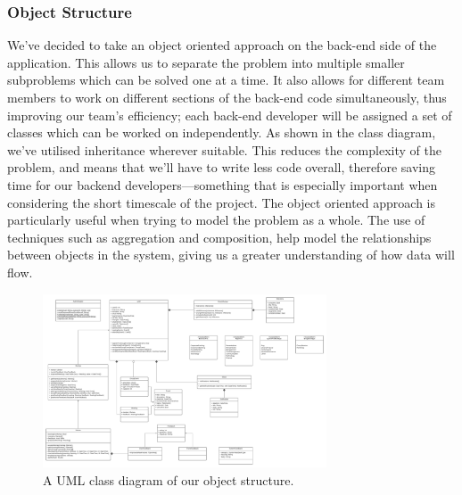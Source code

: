 \documentclass[10pt]{article}
\begin{document}
\subsubsection{Object Structure}
We've decided to take an object oriented approach on the back-end side of the
application. This allows us to separate the problem into multiple smaller
subproblems which can be solved one at a time. It also allows for different team
members to work on different sections of the back-end code simultaneously, thus
improving our team's efficiency; each back-end developer will be assigned a set
of classes which can be worked on independently. As shown in the class diagram,
we've utilised inheritance wherever suitable. This reduces the complexity of the
problem, and means that we'll have to write less code overall, therefore saving
time for our backend developers—something that is especially important when
considering the short timescale of the project. The object oriented approach is
particularly useful when trying to model the problem as a whole. The use of
techniques such as aggregation and composition, help model the relationships
between objects in the system, giving us a greater understanding of how data
will flow.

\begin{figure}[H]
    \centering
    \includegraphics[width=0.75\textwidth]{Objects}
    \caption{A UML class diagram of our object structure.}
    \label{fig:uml_class_diagram}
\end{figure}
\end{document}
